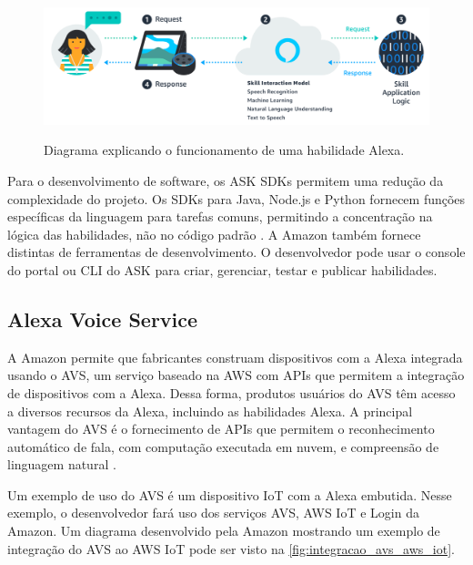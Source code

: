 \begin{figure}[htbp]
    \centering
    \caption{Diagrama explicando o funcionamento de uma habilidade Alexa.}
    \includegraphics[scale=0.35]{Imagens/diagrama_habilidades_alexa.png}
    \label{fig:diagrama_habilidades_alexa}
\end{figure}

Para o desenvolvimento de software, os ASK SDKs permitem uma redução da complexidade do projeto. Os SDKs para Java, Node.js e Python fornecem funções específicas da linguagem para tarefas comuns, permitindo a concentração na lógica das habilidades, não no código padrão \cite{ref:029}. A Amazon também fornece distintas de ferramentas de desenvolvimento. O desenvolvedor pode usar o console do portal ou CLI do ASK para criar, gerenciar, testar e publicar habilidades.

\subsection{Alexa Voice Service}\label{subsection:alexa_voice_service}

A Amazon permite que fabricantes construam dispositivos com a Alexa integrada usando o AVS, um serviço baseado na AWS com APIs que permitem a integração de dispositivos com a Alexa. Dessa forma, produtos usuários do AVS têm acesso a diversos recursos da Alexa, incluindo as habilidades Alexa. A principal vantagem do AVS é o fornecimento de APIs que permitem o reconhecimento automático de fala, com computação executada em nuvem, e compreensão de linguagem natural \cite{ref:002}.

Um exemplo de uso do AVS é um dispositivo IoT com a Alexa embutida. Nesse exemplo, o desenvolvedor fará uso dos serviços AVS, AWS IoT e Login da Amazon. Um diagrama desenvolvido pela Amazon mostrando um exemplo de integração do AVS ao AWS IoT pode ser visto na \autoref{fig:integracao_avs_aws_iot}.

